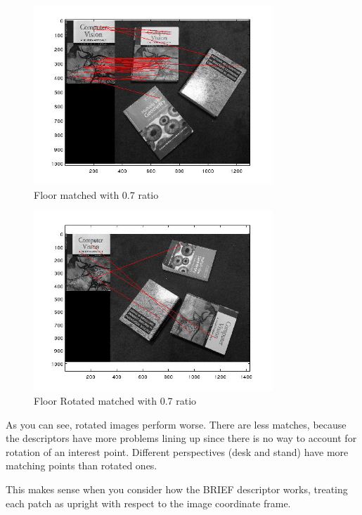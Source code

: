 \documentclass[11pt]{article}
\begin{document}
\begin{figure}[H]
\centering
\includegraphics[width=90mm]{floor.jpg}
\caption{Floor matched with 0.7 ratio }
\end{figure}

\begin{figure}[H]
\centering
\includegraphics[width=90mm]{floor_rotated.jpg}
\caption{Floor Rotated matched with 0.7 ratio }
\end{figure}

As you can see, rotated images perform worse. There are less matches, because the descriptors have more problems lining up since there is no way to account for rotation of an interest point. Different perspectives (desk and stand) have more matching points than rotated ones. 

This makes sense when you consider how the BRIEF descriptor works, treating each patch as upright with respect to the image coordinate frame. 
\end{document}

